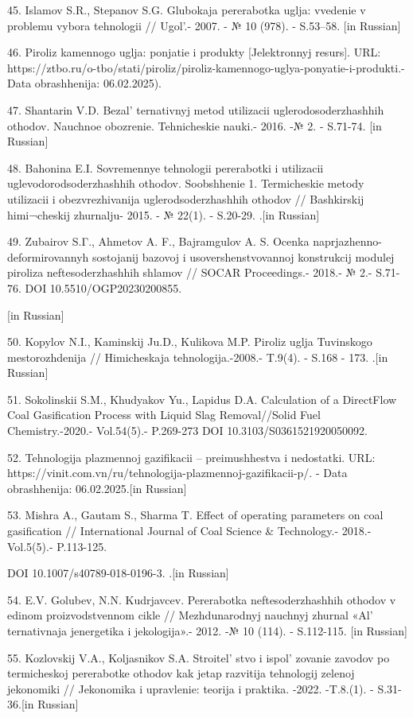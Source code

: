 45. Islamov S.R., Stepanov S.G. Glubokaja pererabotka uglja: vvedenie v
problemu vybora tehnologii // Ugol'.- 2007. - № 10 (978).
- S.53--58. {[}in Russian{]}

46. Piroliz kamennogo uglja: ponjatie i produkty {[}Jelektronnyj
resurs{]}. URL:
https://ztbo.ru/o-tbo/stati/piroliz/piroliz-kamennogo-uglya-ponyatie-i-produkti.-Data
obrashhenija: 06.02.2025).

47. Shantarin V.D. Bezal' ternativnyj metod utilizacii
uglerodosoderzhashhih othodov. Nauchnoe obozrenie. Tehnicheskie nauki.-
2016. -№ 2. - S.71-74. {[}in Russian{]}

48. Bahonina E.I. Sovremennye tehnologii pererabotki i utilizacii
uglevodorodsoderzhashhih othodov. Soobshhenie 1. Termicheskie metody
utilizacii i obezvrezhivanija uglerodsoderzhashhih othodov //
Bashkirskij himi¬cheskij zhurnalju- 2015. - № 22(1). - S.20-29. .{[}in
Russian{]}

49. Zubairov S.Γ., Ahmetov A. F., Bajramgulov A. S. Ocenka
naprjazhenno-deformirovannyh sostojanij bazovoj i usovershenstvovannoj
konstrukcij modulej piroliza neftesoderzhashhih shlamov // SOCAR
Proceedings.- 2018.- № 2.- S.71-76. DOI 10.5510/OGP20230200855.

{[}in Russian{]}

50. Kopylov N.I., Kaminskij Ju.D., Kulikova M.P. Piroliz uglja
Tuvinskogo mestorozhdenija // Himicheskaja tehnologija.-2008.- T.9(4).
- S.168 - 173. .{[}in Russian{]}

51. Sokolinskii S.M., Khudyakov Yu., Lapidus D.A. Calculation of a
DirectFlow Coal Gasification Process with Liquid Slag Removal//Solid
Fuel Chemistry.-2020.- Vol.54(5).- P.269-273 DOI
10.3103/S0361521920050092.

52. Tehnologija plazmennoj gazifikacii -- preimushhestva i nedostatki.
URL: https://vinit.com.vn/ru/tehnologija-plazmennoj-gazifikacii-p/. -
Data obrashhenija: 06.02.2025.{[}in Russian{]}

53. Mishra A., Gautam S., Sharma T. Effect of operating parameters on
coal gasification // International Journal of Coal Science \&
Technology.- 2018.- Vol.5(5).- P.113-125.

DOI 10.1007/s40789-018-0196-3. .{[}in Russian{]}

54. E.V. Golubev, N.N. Kudrjavcev. Pererabotka neftesoderzhashhih
othodov v edinom proizvodstvennom cikle // Mezhdunarodnyj nauchnyj
zhurnal «Al' ternativnaja jenergetika i jekologija».-
2012. -№ 10 (114). - S.112-115. {[}in Russian{]}

55. Kozlovskij V.A., Koljasnikov S.A. Stroitel' stvo i
ispol' zovanie zavodov po termicheskoj pererabotke
othodov kak jetap razvitija tehnologij zelenoj jekonomiki // Jekonomika
i upravlenie: teorija i praktika. -2022. -T.8.(1). - S.31-36.{[}in
Russian{]}

